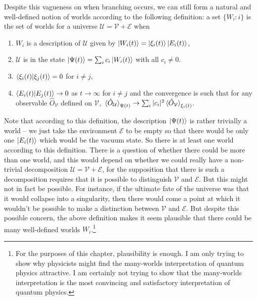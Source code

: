     Despite this vagueness on when branching occurs, we can still form a natural and well-defined notion of worlds according to the following definition: \label{rigorousworld} a set $\{W_i: i\}$ is the set of worlds for a universe $\mathcal{U}=\mathcal{V}+\mathcal{E}$ when 
     \begin{enumerate}[noitemsep, nosep, topsep=0pt]
     \item $W_i$ is a description of $\mathcal{U}$ given by $\ket{W_i(t)}=\ket{\xi_i(t)}\ket{E_i(t)}$,
     \item $\mathcal{U}$ is in the state $\ket{\Psi(t)}=\sum_i c_i \ket{W_i(t)}$ with all $c_i\neq 0$.
     \item $\ip{\xi_i(t)}{\xi_j(t)}=0$ for $i\neq j$,
     \item $\ip{E_i(t)}{E_j(t)}\rightarrow 0$ as $t\rightarrow\infty$ for $i\neq j$ and the convergence is such that for any observable $\hat{O}_\mathcal{V}$ defined on $\mathcal{V}$, $\ev*{\hat{O}_\mathcal{U}}_{\Psi(t)}\rightarrow\sum_i |c_i|^2 \ev*{\hat{O}_\mathcal{V}}_{\xi_i(t)}$. 
     \end{enumerate}
    Note that according to this definition, the description $\ket{\Psi(t)}$ is rather trivially a world -- we just take the environment $\mathcal{E}$ to be empty so that there would be only one $\ket{E_i(t)}$ which would be the vacuum state. So there is at least one world according to this definition. There is a question of whether there could be more than one world, and this would depend on whether we could really have a non-trivial decomposition $\mathcal{U}=\mathcal{V}+\mathcal{E}$, 
    for the supposition that there is such a decomposition requires that it is possible to distinguish $\mathcal{V}$ and $\mathcal{E}$. But this might not in fact be possible. For instance, if the ultimate fate of the universe was that it would collapse into a singularity, then there would come a point at which it wouldn't be possible to make a distinction between $\mathcal{V}$ and $\mathcal{E}$. But despite this possible concern, the above definition makes it seem plausible that there could be many well-defined worlds $W_i$.\footnote{For the purposes of this chapter, plausibility is enough. I am only trying to show why physicists might find the many-worlds interpretation of quantum physics attractive. I am certainly not trying to show that the many-worlds interpretation is the most convincing and satisfactory interpretation of quantum physics. }
    
